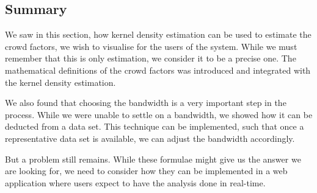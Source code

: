 \subsection{Summary}

We saw in this section, how kernel density estimation can be used to estimate the crowd factors, we wish to visualise for the users of the system. While we must remember that this is only estimation, we consider it to be a precise one. The mathematical definitions of the crowd factors was introduced and integrated with the kernel density estimation.

We also found that choosing the bandwidth is a very important step in the process. While we were unable to settle on a bandwidth, we showed how it can be deducted from a data set. This technique can be implemented, such that once a representative data set is available, we can adjust the bandwidth accordingly.

But a problem still remains. While these formulae might give us the answer we are looking for, we need to consider how they can be implemented in a web application where users expect to have the analysis done in real-time.





